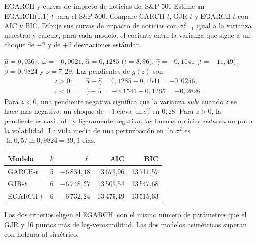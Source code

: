 \begin{ejresuelto}{EGARCH y curvas de impacto de noticias del S\&P 500}\label{ej:egarch}
\enunciado Estime un EGARCH(1,1)-$t$ para el S\&P 500. Compare GARCH-$t$, GJR-$t$ y EGARCH-$t$ con AIC y BIC.
Dibuje sus curvas de impacto de noticias con $\sigma_{t-1}^2$ igual a la varianza muestral y calcule, para cada
modelo, el cociente entre la varianza que sigue a un choque de $-2$ y de $+2$ desviaciones estándar.

\solucion
{} $\hat\mu=0{,}0367$, $\hat\omega=-0{,}0021$, $\hat\alpha=0{,}1285$ ($t=8{,}96$),
$\hat\gamma=-0{,}1541$ ($t=-11{,}49$), $\hat\beta=0{,}9824$ y $\hat\nu=7{,}29$. Las pendientes de $g(z)$ son
\begin{align*}
  z>0:&\quad \hat\alpha+\hat\gamma=0{,}1285-0{,}1541=-0{,}0256,\\
  z<0:&\quad \hat\gamma-\hat\alpha=-0{,}1541-0{,}1285=-0{,}2826 .
\end{align*}
Para $z<0$, una pendiente negativa significa que la varianza \emph{sube} cuando $z$ se hace más negativo: un
choque de $-1$ eleva $\ln\sigma_t^2$ en $0{,}28$. Para $z>0$, la pendiente es casi nula y ligeramente negativa:
las buenas noticias \emph{reducen} un poco la volatilidad. La vida media de una perturbación en
$\ln\sigma^2$ es $\ln0{,}5/\ln0{,}9824=39{,}1$ días.

\begin{center}\small
\begin{tabular}{@{}lrrrr@{}}
\toprule
Modelo & $k$ & $\hat\ell$ & AIC & BIC \\
\midrule
GARCH-$t$  & 5 & $-6\,834{,}48$ & 13\,678,96 & 13\,711,57 \\
GJR-$t$    & 6 & $-6\,748{,}27$ & 13\,508,54 & 13\,547,68 \\
EGARCH-$t$ & 6 & $-6\,732{,}24$ & 13\,476,49 & 13\,515,63 \\
\bottomrule
\end{tabular}
\end{center}
Los dos criterios eligen el EGARCH, con el mismo número de parámetros que el GJR y 16 puntos más de
log-verosimilitud. Los dos modelos asimétricos superan con holgura al simétrico.


\end{ejresuelto}
